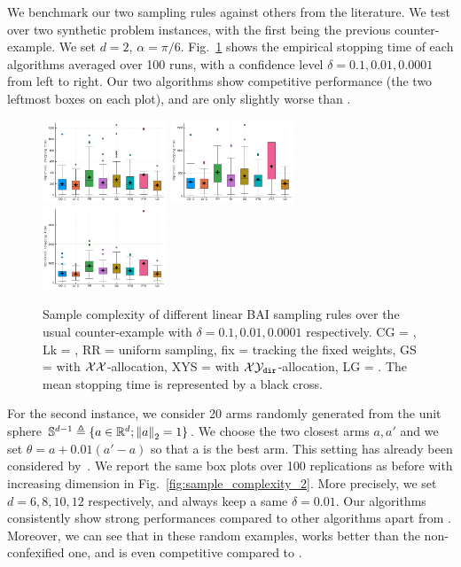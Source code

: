 We benchmark our two sampling rules against others from the literature. %
We test over two synthetic problem instances, with the first being the previous counter-example. We set $d=2$, $\alpha=\pi/6$. Fig.~\ref{fig:sample_complexity_1} shows the empirical stopping time of each algorithms averaged over 100 runs, with a confidence level $\delta=0.1, 0.01, 0.0001$ from left to right. Our two algorithms show competitive performance (the two leftmost boxes on each plot), and are only slightly worse than \LGapE.

\begin{figure}[ht]
 \centering
 \includegraphics[clip, width= 0.33\textwidth]{Chapter4/img/bai_sin_0-1}
 \includegraphics[clip, width= 0.33\textwidth]{Chapter4/img/bai_sin_0-01}
 \includegraphics[clip, width= 0.33\textwidth]{Chapter4/img/bai_sin_0-0001}
 \caption{Sample complexity of different linear BAI sampling rules over the usual counter-example with $\delta=0.1, 0.01, 0.0001$ respectively. CG = \LGC,  Lk = \LG, RR = uniform sampling, fix = tracking the fixed weights, GS = \XYS with $\mathcal{X}\mathcal{X}$-allocation, XYS = \XYS with $\mathcal{X}\mathcal{Y}_{\texttt{dir}}$-allocation, LG = \LGapE. The mean stopping time is represented by a black cross.}
 \label{fig:sample_complexity_1}
\end{figure}

For the second instance, we consider 20 arms randomly generated from the unit sphere $\mathbb{S}^{d-1}\triangleq\{a\in\mathbb{R}^d; \left\lVert a\right\rVert_2=1\}$. We choose the two closest arms $a, a'$ and we set $\theta = a + 0.01(a'-a)$ so that a is the best arm. This setting has already been considered by~\citet{tao2018alba}. We report the same box plots over 100 replications as before with increasing dimension in Fig.~\ref{fig:sample_complexity_2}. More precisely, we set $d=6, 8, 10, 12$ respectively, and always keep a same $\delta = 0.01$. Our algorithms consistently show strong performances compared to other algorithms apart from \LGapE. Moreover, we can see that in these random examples, \LGC works better than the non-confexified one, and is even competitive compared to \LGapE.


